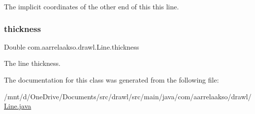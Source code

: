 The implicit coordinates of the other end of this this line. 

\mbox{\label{classcom_1_1aarrelaakso_1_1drawl_1_1_line_a314ae0371f5665cf70ad99742d44934a}} 
\subsubsection{\texorpdfstring{thickness}{thickness}}
{\footnotesize\ttfamily Double com.\+aarrelaakso.\+drawl.\+Line.\+thickness\hspace{0.3cm}{\ttfamily [private]}}



The line thickness. 



The documentation for this class was generated from the following file\+:\begin{DoxyCompactItemize}
\item 
/mnt/d/\+One\+Drive/\+Documents/src/drawl/src/main/java/com/aarrelaakso/drawl/\hyperlink{_line_8java}{Line.\+java}\end{DoxyCompactItemize}
